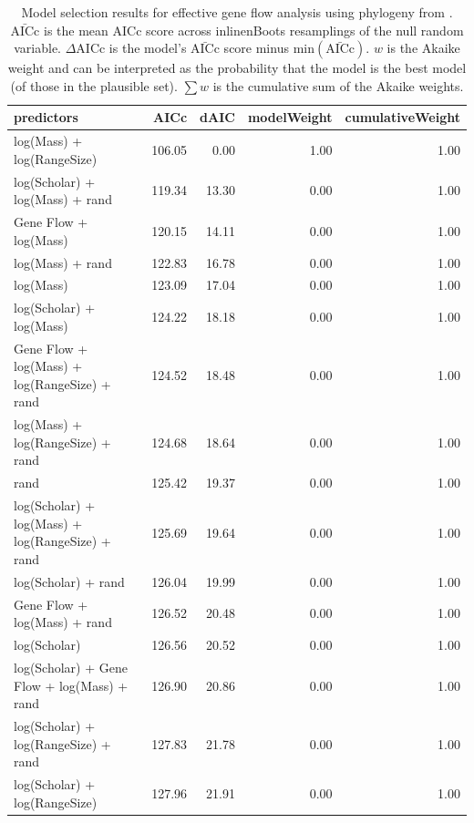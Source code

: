 \begin{table}[ht]
\centering
\caption[
  Full model selection results for effective gene flow analysis with alternative phylogeny. 
]{
  Model selection results for effective gene flow analysis using phylogeny from \cite{jones2005bats}. 
  $\bar{\text{AICc}}$ is the mean AICc score across 
inline{nBoots} resamplings of the null random variable. 
  $\Delta$AICc is the model's $\bar{\text{AICc}}$ score minus $\text{min}(\bar{\text{AICc}})$. 
  $w$ is the Akaike weight and can be interpreted as the probability that the model is the best model (of those in the plausible set).
  $\sum w$ is the cumulative sum of the Akaike weights.
  } 
\label{A-fstModelWeights2}
\begingroup\scriptsize
\begin{tabular}{@{}lrrrr@{}}
  \toprule
predictors & AICc & dAIC & modelWeight & cumulativeWeight \\ 
  \midrule
log(Mass) + log(RangeSize) & 106.05 & 0.00 & 1.00 & 1.00 \\ 
  log(Scholar) + log(Mass) + rand & 119.34 & 13.30 & 0.00 & 1.00 \\ 
  Gene Flow + log(Mass) & 120.15 & 14.11 & 0.00 & 1.00 \\ 
  log(Mass) + rand & 122.83 & 16.78 & 0.00 & 1.00 \\ 
  log(Mass) & 123.09 & 17.04 & 0.00 & 1.00 \\ 
  log(Scholar) + log(Mass) & 124.22 & 18.18 & 0.00 & 1.00 \\ 
  Gene Flow + log(Mass) + log(RangeSize) + rand & 124.52 & 18.48 & 0.00 & 1.00 \\ 
  log(Mass) + log(RangeSize) + rand & 124.68 & 18.64 & 0.00 & 1.00 \\ 
  rand & 125.42 & 19.37 & 0.00 & 1.00 \\ 
  log(Scholar) + log(Mass) + log(RangeSize) + rand & 125.69 & 19.64 & 0.00 & 1.00 \\ 
  log(Scholar) + rand & 126.04 & 19.99 & 0.00 & 1.00 \\ 
  Gene Flow + log(Mass) + rand & 126.52 & 20.48 & 0.00 & 1.00 \\ 
  log(Scholar) & 126.56 & 20.52 & 0.00 & 1.00 \\ 
  log(Scholar) + Gene Flow + log(Mass) + rand & 126.90 & 20.86 & 0.00 & 1.00 \\ 
  log(Scholar) + log(RangeSize) + rand & 127.83 & 21.78 & 0.00 & 1.00 \\ 
  log(Scholar) + log(RangeSize) & 127.96 & 21.91 & 0.00 & 1.00 \\ 

\end{tabular}
\end{table}

